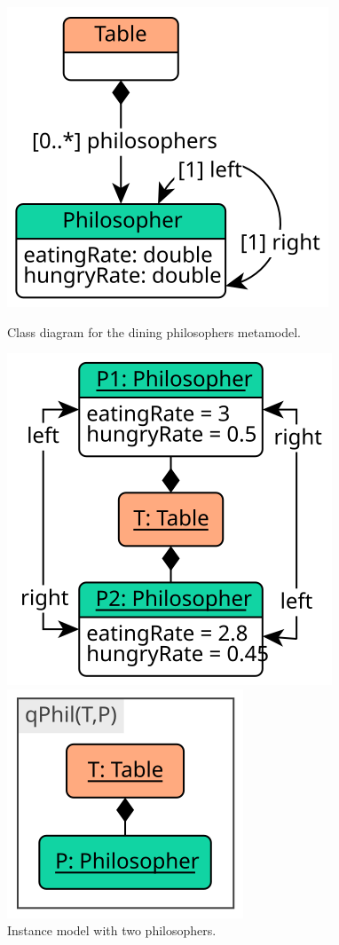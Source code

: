 \begin{figure}%
  \begin{minipage}[t]{0.3333\textwidth}
    \centering
    \includegraphics[scale=0.9]{figures/phil_cd}
    \caption{\protect\RaggedRight Class diagram for the dining philosophers metamodel.}
    \label{fig:background:metamodel}
  \end{minipage}%
  \begin{minipage}[t]{0.3333\textwidth}
    \centering
    \includegraphics[scale=0.9]{figures/phil_instance}
    \caption{\protect\RaggedRight Instance model with two philosophers.}
    \label{fig:background:instance}
  \end{minipage}%
  \begin{minipage}[t]{0.3333\textwidth}
    \centering
    \includegraphics[scale=0.9]{figures/q_phil_pattern}

\end{minipage}
\end{figure}

